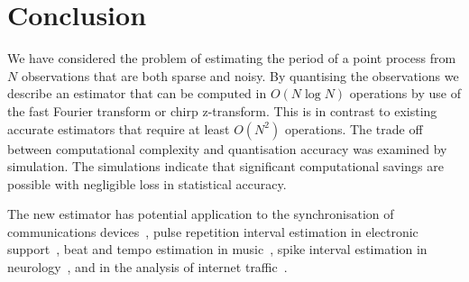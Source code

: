 \documentclass[10pt,twocolumn,twoside]{IEEEtran}
\begin{document}
 

\section{Conclusion}

We have considered the problem of estimating the period of a point process from $N$ observations that are both sparse and noisy.  By quantising the observations we describe an estimator that can be computed in $O(N\log N)$ operations by use of the fast Fourier transform or chirp z-transform.  This is in contrast to existing accurate estimators that require at least $O(N^2)$ operations.  The trade off between computational complexity and quantisation accuracy was examined by simulation.  The simulations indicate that significant computational savings are possible with negligible loss in statistical accuracy.

The new estimator has potential application to the synchronisation of communications devices~\cite{Fogel1988,Fogel1989_bit_synch_zero_crossings}, pulse repetition interval estimation in electronic support~\cite{EltonGray_puilse_train_rader_1994,Gray_more_pri_1994,Clarkson_thesis,clarkson_estimate_period_pulse_train_1996,Hauochan_pri_2012}, beat and tempo estimation in music~\cite{dixon_beat_extraction_2001}, spike interval estimation in neurology~\cite{Arnett_neuro_pri_1976,Brillinger_spike_trains_1988,Rossoni200630}, and in the analysis of internet traffic~\cite{He_detecting_periodic_patterns_in_internet_2006,5585849,5947313}.


\small

\end{document}
